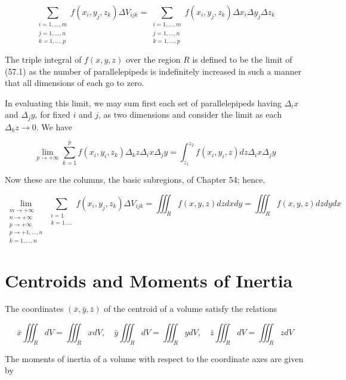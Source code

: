 \documentclass[10pt]{article}
\begin{document}
\begin{equation*}
\sum_{\substack{i=1, \ldots, m \\ j=1, \ldots, n \\ k=1, \ldots, p}} f\left(x_{i}, y_{j}, z_{k}\right) \Delta V_{i j k}=\sum_{\substack{i=1, \ldots, m \\ j=1, \ldots, n \\ k=1, \ldots, p}} f\left(x_{i}, y_{j}, z_{k}\right) \Delta x_{i} \Delta y_{j} \Delta z_{k} \tag{57.1}
\end{equation*}


The triple integral of $f(x, y, z)$ over the region $R$ is defined to be the limit of (57.1) as the number of parallelepipeds is indefinitely increased in such a manner that all dimensions of each go to zero.

In evaluating this limit, we may sum first each set of parallelepipeds having $\Delta_{i} x$ and $\Delta_{j} y$, for fixed $i$ and $j$, as two dimensions and consider the limit as each $\Delta_{k} z \rightarrow 0$. We have

$$
\lim _{p \rightarrow+\infty} \sum_{k=1}^{p} f\left(x_{i}, y_{i}, z_{k}\right) \Delta_{k} z \Delta_{i} x \Delta_{j} y=\int_{z_{1}}^{z_{2}} f\left(x_{i}, y_{i}, z\right) d z \Delta_{i} x \Delta_{j} y
$$

Now these are the columns, the basic subregions, of Chapter 54; hence,

$$
\lim _{\substack{m \rightarrow+\infty \\ n \rightarrow+\infty \\ p \rightarrow+\infty \\ p \rightarrow+1, \ldots, n \\ k=1, \ldots, n}} \sum_{\substack{i=1 \\ k=1, \ldots}} f\left(x_{i}, y_{j}, z_{k}\right) \Delta V_{i j k}=\iiint_{R} f(x, y, z) d z d x d y=\iiint_{R} f(x, y, z) d z d y d x
$$

\section*{Centroids and Moments of Inertia}
The coordinates $(\bar{x}, \bar{y}, \bar{z})$ of the centroid of a volume satisfy the relations

$$
\bar{x} \iiint_{R} d V=\iiint_{R} x d V, \quad \bar{y} \iiint_{R} d V=\iiint_{R} y d V, \quad \bar{z} \iiint_{R} d V=\iiint_{R} z d V
$$

The moments of inertia of a volume with respect to the coordinate axes are given by
\end{document}

